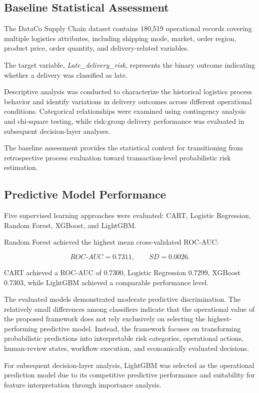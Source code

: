\documentclass[11pt,a4paper]{article}
\begin{document}
\subsection{Baseline Statistical Assessment}

The DataCo Supply Chain dataset contains 180,519 operational records covering multiple logistics attributes, including shipping mode, market, order region, product price, order quantity, and delivery-related variables.

The target variable, \textit{Late\_delivery\_risk}, represents the binary outcome indicating whether a delivery was classified as late.

Descriptive analysis was conducted to characterize the historical logistics process behavior and identify variations in delivery outcomes across different operational conditions. Categorical relationships were examined using contingency analysis and chi-square testing, while risk-group delivery performance was evaluated in subsequent decision-layer analyses.

The baseline assessment provides the statistical context for transitioning from retrospective process evaluation toward transaction-level probabilistic risk estimation.

\subsection{Predictive Model Performance}

Five supervised learning approaches were evaluated: CART, Logistic Regression, Random Forest, XGBoost, and LightGBM.

Random Forest achieved the highest mean cross-validated ROC-AUC:

\[
ROC\text{-}AUC = 0.7311,
\qquad
SD=0.0026.
\]

CART achieved a ROC-AUC of 0.7300, Logistic Regression 0.7299, XGBoost 0.7303, while LightGBM achieved a comparable performance level.

The evaluated models demonstrated moderate predictive discrimination. The relatively small differences among classifiers indicate that the operational value of the proposed framework does not rely exclusively on selecting the highest-performing predictive model. Instead, the framework focuses on transforming probabilistic predictions into interpretable risk categories, operational actions, human-review states, workflow execution, and economically evaluated decisions.

For subsequent decision-layer analysis, LightGBM was selected as the operational prediction model due to its competitive predictive performance and suitability for feature interpretation through importance analysis.
\end{document}

